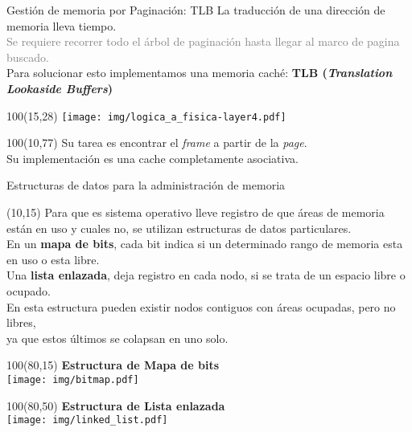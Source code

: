 \documentclass[aspectratio=169]{beamer}
\begin{document}
\begin{frame}[t]{Gestión de memoria por Paginación: TLB}
    \small
    La traducción de una dirección de memoria lleva tiempo.\\
    \textcolor{gray}{Se requiere recorrer todo el árbol de paginación hasta llegar al marco de pagina buscado.}\\
    \medskip
    Para solucionar esto implementamos una memoria caché: \textcolor{naranjauca}{\textbf{TLB (\emph{Translation Lookaside Buffers})}}\\
    \begin{textblock}{100}(15,28)
    \texttt{[image: img/logica\_a\_fisica-layer4.pdf]}
    \end{textblock}
    \begin{textblock}{100}(10,77)
    Su tarea es encontrar el \emph{frame} a partir de la \emph{page}.\\
    Su implementación es una cache completamente asociativa.
    \end{textblock}
\end{frame}

\begin{frame}{Estructuras de datos para la administración de memoria}
    \begin{textblock}{65}(10,15)
    \small
    Para que es sistema operativo lleve registro de que áreas de memoria están en uso y cuales no, se utilizan estructuras de datos particulares.\\
    \vspace{0.7cm}
    En un \textbf{mapa de bits}, cada bit indica si un determinado rango de memoria esta en uso o esta libre.\\
    \bigskip
    Una \textbf{lista enlazada}, deja registro en cada nodo, si se trata de un espacio libre o ocupado.\\
    En esta estructura pueden existir nodos contiguos con áreas ocupadas, pero no libres,\\ ya que estos últimos se colapsan en uno solo.
    \end{textblock}
    \begin{textblock}{100}(80,15)
    \small \textcolor{naranjauca}{\textbf{Estructura de Mapa de bits}}\\ \vspace{0.2cm}
    \texttt{[image: img/bitmap.pdf]}
    \end{textblock}
    \begin{textblock}{100}(80,50)
    \small \textcolor{naranjauca}{\textbf{Estructura de Lista enlazada}}\\ \vspace{0.2cm}
    \texttt{[image: img/linked\_list.pdf]}
    \end{textblock}
\end{frame}
\end{document}
